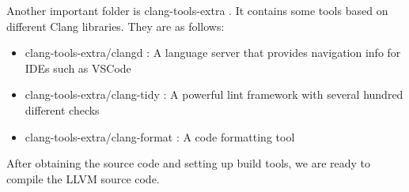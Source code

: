 Another important folder is clang-tools-extra . It contains some tools based on different Clang libraries. They are as follows:


\begin{itemize}
\item
clang-tools-extra/clangd : A language server that provides navigation info for IDEs such as VSCode

\item
clang-tools-extra/clang-tidy : A powerful lint framework with several hundred different checks

\item
clang-tools-extra/clang-format : A code formatting tool
\end{itemize}

After obtaining the source code and setting up build tools, we are ready to compile the LLVM source code.























